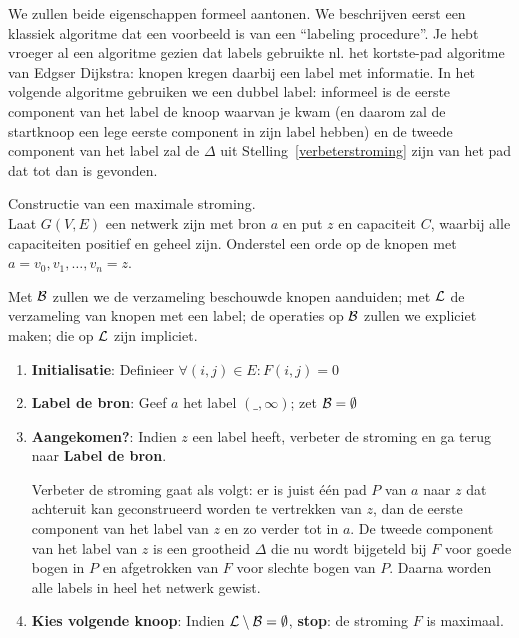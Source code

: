 We zullen beide eigenschappen formeel aantonen. We beschrijven eerst
een klassiek algoritme dat een voorbeeld is van een ``labeling
procedure''. Je hebt vroeger al een algoritme gezien dat labels
gebruikte nl. het kortste-pad algoritme van Edgser Dijkstra: knopen kregen
daarbij een label met informatie. In het volgende algoritme gebruiken
we een dubbel label: informeel is de eerste component van
het label de knoop waarvan je kwam (en daarom zal de startknoop een
lege eerste component in zijn label hebben) en de tweede component van
het label zal de $\Delta$ uit Stelling~\ref{verbeterstroming} zijn van
het pad dat tot dan is gevonden.

\begin{algo} Constructie van een maximale stroming.
\label{maxflow}\\
Laat $G(V,E)$ een netwerk zijn met bron $a$ en put $z$ en capaciteit $C$,
waarbij alle capaciteiten positief en geheel zijn. Onderstel een
orde op de knopen met $a = v_{0}, v_{1}, \ldots , v_{n} = z$.

Met ${\cal B}$ zullen we de verzameling beschouwde knopen aanduiden;
met ${\cal L}$ de verzameling van knopen met een label; de operaties
op ${\cal B}$ zullen we expliciet maken; die op ${\cal L}$ zijn impliciet.

\begin{enumerate} \item \textbf{Initialisatie}:
Definieer $\forall (i,j) \in E: F(i,j) = 0$

\item
\textbf{Label de bron}: Geef $a$ het label $(\_,\infty)$;  zet ${\cal B} = \emptyset$

\item
\textbf{Aangekomen?}: Indien $z$ een label heeft, verbeter de stroming
en ga terug naar \textbf{Label de bron}.

Verbeter de stroming gaat als volgt: er is juist \'{e}\'{e}n pad $P$ van $a$ naar
$z$ dat achteruit kan geconstrueerd worden te vertrekken van $z$, dan
de eerste component van het label van $z$ en zo verder tot in $a$. De
tweede component van het label van $z$ is een grootheid $\Delta$ die
nu wordt bijgeteld bij $F$ voor goede bogen in $P$ en afgetrokken van
$F$ voor slechte bogen van $P$. Daarna worden alle labels in heel het
netwerk gewist.

\item
\textbf{Kies volgende knoop}: Indien ${\cal L} \setminus {\cal B} =
\emptyset$, \textbf{stop}: de stroming $F$ is maximaal.


\end{enumerate}
\end{algo}
